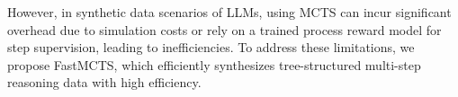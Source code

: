 However, in synthetic data scenarios of LLMs, using MCTS can incur significant overhead due to simulation costs or rely on a trained process reward model for step supervision, leading to inefficiencies. To address these limitations, we propose FastMCTS, which efficiently synthesizes tree-structured multi-step reasoning data with high efficiency.

















